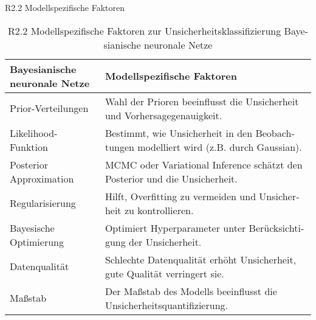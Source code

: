 \begin{otherlanguage}{ngerman}
\newline
R2.2 Modellspezifische Faktoren

\begin{table}[!htpb]
  \centering
  \begin{tabularx}{\textwidth}{|l|X|}
    \hline
    \textbf{\gls{Bayesianische neuronale Netze}} & \textbf{Modellspezifische Faktoren} \\
    \hline
    Prior-Verteilungen & Wahl der Prioren beeinflusst die Unsicherheit und Vorhersagegenauigkeit. \\
    \hline
    Likelihood-Funktion & Bestimmt, wie Unsicherheit in den Beobachtungen modelliert wird (z.B. durch Gaussian). \\
    \hline
    Posterior Approximation & MCMC oder Variational Inference schätzt den Posterior und die Unsicherheit. \\
    \hline
    Regularisierung & Hilft, Overfitting zu vermeiden und Unsicherheit zu kontrollieren. \\
    \hline
    Bayesische Optimierung & Optimiert Hyperparameter unter Berücksichtigung der Unsicherheit. \\
    \hline
    Datenqualität & Schlechte Datenqualität erhöht Unsicherheit, gute Qualität verringert sie. \\
    \hline
    Maßstab & Der Maßstab des Modells beeinflusst die Unsicherheitsquantifizierung. \\
    \hline
  \end{tabularx}
  \caption{R2.2 Modellspezifische Faktoren zur Unsicherheitsklassifizierung \gls{Bayesianische neuronale Netze}}\label{tab:chapter6r22}
\end{table}


\end{otherlanguage}
